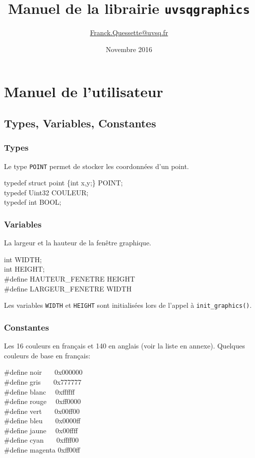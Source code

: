 \documentclass{report}
\title{Manuel de la librairie \texttt{uvsqgraphics}}
\author{\href{mailto:Franck.Quessette@uvsq.fr?Subject=uvsqgraphics}{Franck.Quessette@uvsq.fr}}
\date{Novembre 2016}
\newcommand\code[1]{
\begin{mdframed}[linecolor=purple,backgroundcolor=blue!10]
{\tt
#1
}
\end{mdframed}
}
\begin{document}
\maketitle
\tableofcontents

\chapter{Manuel de l'utilisateur}
\section{Types, Variables, Constantes}

\subsection{Types}
Le type \texttt{POINT} permet de stocker les coordonnées d'un point.
\code{
typedef struct point \{int x,y;\} POINT; \\
typedef Uint32 COULEUR; \\
typedef int BOOL;
}

\subsection{Variables}
La largeur et la hauteur de la fenêtre graphique.
\code{
int WIDTH; \\
int HEIGHT; \\
\#define HAUTEUR\_FENETRE HEIGHT\\
\#define LARGEUR\_FENETRE WIDTH
}

\noindent
Les variables \texttt{WIDTH} et \texttt{HEIGHT} sont initialisées lors de l'appel à \texttt{init\_graphics()}.

\subsection{Constantes}

Les 16 couleurs en français et 140 en anglais (voir la liste en annexe).
Quelques couleurs de base en français:
\code{
\#define noir~~~ 0x000000 \\
\#define gris~~~ 0x777777 \\
\#define blanc~~ 0xffffff \\
\#define rouge~~ 0xff0000 \\
\#define vert~~~ 0x00ff00 \\
\#define bleu~~~ 0x0000ff \\
\#define jaune~~ 0x00ffff \\
\#define cyan~~~ 0xffff00 \\
\#define magenta 0xff00ff
}
\end{document}
